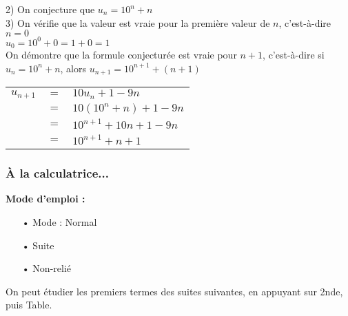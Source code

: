 2) On conjecture que $u_n = 10^n + n$ \\

3) On vérifie que la valeur est vraie pour la première valeur de $n$, c'est-à-dire $n = 0$ \\

$u_0 = 10^0 + 0 = 1 + 0 = 1 $ \\

On démontre que la formule conjecturée est vraie pour $n + 1$, c'est-à-dire si $u_n = 10^n + n$, alors $u_{n+1} = 10^{n+1} + \left(n+1\right)$ \\

\begin{tabular}{lll}
$u_{n+1}$ & $=$ & $10u_n + 1 - 9n$ \\
& $=$ & $10\left(10^n + n\right) + 1 - 9n$ \\
& $=$ & $10^{n+1} + 10n + 1 - 9n $ \\
& $=$ & $10^{n+1} + n + 1$ \\
\end{tabular}

\subsubsection{À la calculatrice...}

\textbf{Mode d'emploi : }

\begin{itemize}
\item[•] Mode : Normal
\item[•] Suite
\item[•] Non-relié
\end{itemize}

\vspace*{.3cm}

On peut étudier les premiers termes des suites suivantes, en appuyant sur 2nde, puis Table. \\

